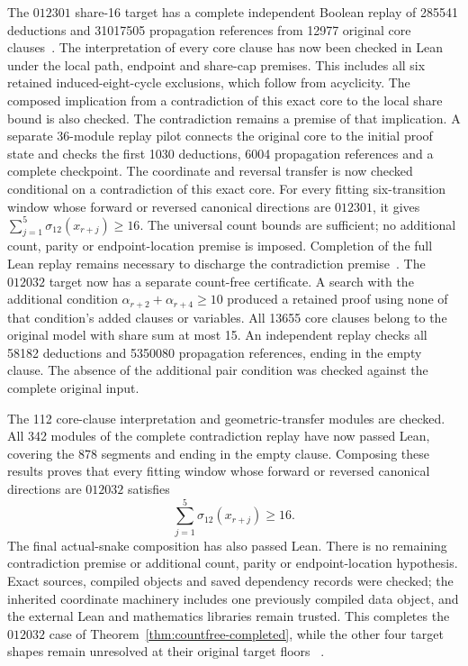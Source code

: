 \documentclass[11pt,a4paper]{article}
\theoremstyle{definition}
\theoremstyle{remark}
\begin{document}
The $012301$ share-16 target has a complete independent Boolean replay of
285541 deductions and 31017505 propagation references from 12977 original
core clauses~\cite{share145archive}. The interpretation of every core clause
has now been checked in Lean under the local path, endpoint and share-cap
premises. This includes all six retained induced-eight-cycle exclusions,
which follow from acyclicity. The composed implication from a contradiction
of this exact core to the local share bound is also checked. The contradiction
remains a premise of that implication. A separate 36-module replay pilot
connects the original core to the initial proof state and checks the first
1030 deductions, 6004 propagation references and a complete checkpoint.
The coordinate and reversal transfer is now checked conditional on a
contradiction of this exact core. For every fitting six-transition window
whose forward or reversed canonical directions are $012301$, it gives
$\sum_{j=1}^{5}\sigma_{12}(x_{r+j})\ge16$. The universal count bounds are
sufficient; no additional count, parity or endpoint-location premise is
imposed. Completion of the full Lean replay remains necessary to discharge
the contradiction premise~\cite{semantics147archive,transfer148archive}.
The $012032$ target now has a separate count-free certificate. A search
with the additional condition $\alpha_{r+2}+\alpha_{r+4}\ge10$ produced
a retained proof using none of that condition's added clauses or variables.
All 13655 core clauses belong to the original model with share sum at most
15. An independent replay checks all 58182 deductions and 5350080
propagation references, ending in the empty clause. The absence of the
additional pair condition was checked against the complete original input.

The 112 core-clause interpretation and geometric-transfer modules are
checked. All 342 modules of the complete contradiction replay have now
passed Lean, covering the 878 segments and ending in the empty clause.
Composing these results proves that every fitting window whose forward
or reversed canonical directions are $012032$ satisfies
\[
\sum_{j=1}^{5}\sigma_{12}(x_{r+j})\ge16.
\]
The final actual-snake composition has also passed Lean. There is no
remaining contradiction premise or additional count, parity or
endpoint-location hypothesis. Exact sources, compiled objects and saved
dependency records were checked; the inherited coordinate machinery
includes one previously compiled data object, and the external Lean and
mathematics libraries remain trusted. This completes the $012032$ case
of Theorem~\ref{thm:countfree-completed}, while the other four target
shapes remain unresolved at their original target floors
~\cite{share150archive,pilot151archive,share152archive}.
\end{document}
